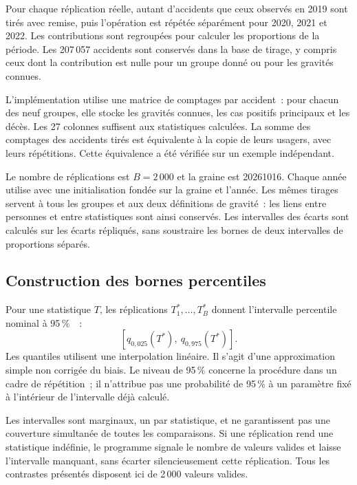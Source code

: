 Pour chaque réplication réelle, autant d'accidents que ceux observés en 2019 sont
tirés avec remise, puis l'opération est répétée séparément pour 2020, 2021 et 2022.
Les contributions sont regroupées pour calculer les proportions de la période.
Les 207\,057 accidents sont conservés dans la base de tirage, y compris ceux dont
la contribution est nulle pour un groupe donné ou pour les gravités connues.

L'implémentation utilise une matrice de comptages par accident~: pour chacun des neuf
groupes, elle stocke les gravités connues, les cas positifs principaux et les décès.
Les 27 colonnes suffisent aux statistiques calculées. La somme des comptages des
accidents tirés est équivalente à la copie de leurs usagers, avec leurs répétitions.
Cette équivalence a été vérifiée sur un exemple indépendant.

Le nombre de réplications est $B=2\,000$ et la graine est 20261016. Chaque année utilise
 avec une initialisation fondée sur la graine et l'année.
Les mêmes tirages servent à tous les groupes et aux deux définitions de gravité~:
les liens entre personnes et entre statistiques sont ainsi conservés. Les intervalles
des écarts sont calculés sur les écarts répliqués, sans soustraire les bornes de deux
intervalles de proportions séparés.

\subsection{Construction des bornes percentiles}
Pour une statistique $T$, les réplications $T_1^*,\ldots,T_B^*$ donnent l'intervalle
percentile nominal à 95\,\%~\cite{nist-bootstrap}~:
\begin{equation}
 \left[q_{0,025}(T^*),\ q_{0,975}(T^*)\right].
 \label{eq:ic}
\end{equation}
Les quantiles utilisent une interpolation linéaire. Il s'agit d'une approximation
simple non corrigée du biais. Le niveau de 95\,\% concerne la procédure dans un cadre
de répétition~; il n'attribue pas une probabilité de 95\,\% à un paramètre fixé à
l'intérieur de l'intervalle déjà calculé.

Les intervalles sont marginaux, un par statistique, et ne garantissent pas une
couverture simultanée de toutes les comparaisons. Si une réplication rend une
statistique indéfinie, le programme signale le nombre de valeurs valides et laisse
l'intervalle manquant, sans écarter silencieusement cette réplication. Tous les
contrastes présentés disposent ici de 2\,000 valeurs valides.

